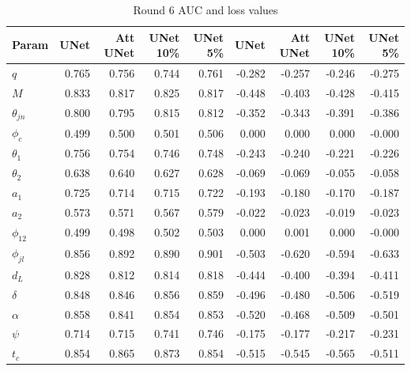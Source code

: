\begin{table}
\caption{Round 6 AUC and loss values}
\hspace*{-2cm}
\begin{tabular}{lrrrrrrrr}
\toprule
Param & 
\multicolumn{1}{p{0.3cm}}{\raggedright UNet}  & 
\multicolumn{1}{p{0.3cm}}{\raggedleft Att UNet}  &
\multicolumn{1}{p{0.3cm}}{\raggedleft UNet 10\%}  &
\multicolumn{1}{p{0.3cm}}{\raggedleft UNet 5\%}  &
\multicolumn{1}{p{0.3cm}}{\raggedright UNet}  & 
\multicolumn{1}{p{0.3cm}}{\raggedleft Att UNet}  &
\multicolumn{1}{p{0.3cm}}{\raggedleft UNet 10\%}  &
\multicolumn{1}{p{0.3cm}}{\raggedleft UNet 5\%}  \\
\midrule
$q$ & 0.765 & 0.756 & 0.744 & 0.761 & -0.282 & -0.257 & -0.246 & -0.275 \\
$M$ & 0.833 & 0.817 & 0.825 & 0.817 & -0.448 & -0.403 & -0.428 & -0.415 \\
$\theta_{jn}$ & 0.800 & 0.795 & 0.815 & 0.812 & -0.352 & -0.343 & -0.391 & -0.386 \\
$\phi_c$ & 0.499 & 0.500 & 0.501 & 0.506 & 0.000 & 0.000 & 0.000 & -0.000 \\
$\theta_1$ & 0.756 & 0.754 & 0.746 & 0.748 & -0.243 & -0.240 & -0.221 & -0.226 \\
$\theta_2$ & 0.638 & 0.640 & 0.627 & 0.628 & -0.069 & -0.069 & -0.055 & -0.058 \\
$a_1$ & 0.725 & 0.714 & 0.715 & 0.722 & -0.193 & -0.180 & -0.170 & -0.187 \\
$a_2$ & 0.573 & 0.571 & 0.567 & 0.579 & -0.022 & -0.023 & -0.019 & -0.023 \\
$\phi_{12}$ & 0.499 & 0.498 & 0.502 & 0.503 & 0.000 & 0.001 & 0.000 & -0.000 \\
$\phi_{jl}$ & 0.856 & 0.892 & 0.890 & 0.901 & -0.503 & -0.620 & -0.594 & -0.633 \\
$d_L$  & 0.828 & 0.812 & 0.814 & 0.818 & -0.444 & -0.400 & -0.394 & -0.411 \\
$\delta$  & 0.848 & 0.846 & 0.856 & 0.859 & -0.496 & -0.480 & -0.506 & -0.519 \\
$\alpha$  & 0.858 & 0.841 & 0.854 & 0.853 & -0.520 & -0.468 & -0.509 & -0.501 \\
$\psi$ & 0.714 & 0.715 & 0.741 & 0.746 & -0.175 & -0.177 & -0.217 & -0.231 \\
$t_c$ & 0.854 & 0.865 & 0.873 & 0.854 & -0.515 & -0.545 & -0.565 & -0.511 \\

\bottomrule
\end{tabular}
\end{table}

